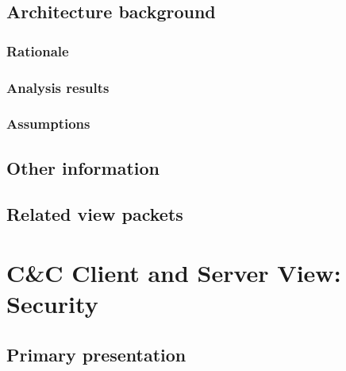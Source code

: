 \documentclass[a4paper,10pt]{paper}
\begin{document}
\subsection{Architecture background}

\subsubsection{Rationale}

\subsubsection{Analysis results}

\subsubsection{Assumptions}

\subsection{Other information}

\subsection{Related view packets}


\section{C\&C Client and Server View: Security}
\label{Client and Server View: Security}

\subsection{Primary presentation}
\end{document}
